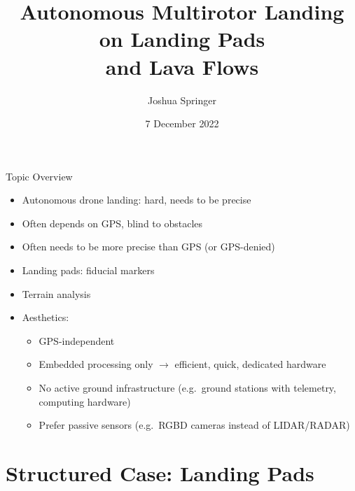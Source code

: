 \documentclass[aspectratio=169]{beamer}
\title{Autonomous Multirotor Landing on Landing Pads\\and Lava Flows}
\author{Joshua Springer}
\institute{Reykjavik University\\Department of Computer Science\\Supervisor: Marcel Kyas}
\date{7 December 2022}
\newcommand{\nologo}{\setbeamertemplate{logo}{}}
\begin{document}
\maketitle

\nologo

\begin{frame}{Topic Overview}
	\begin{itemize}
		\item Autonomous drone landing: hard, needs to be precise
		\item Often depends on GPS, blind to obstacles
		\item Often needs to be more precise than GPS (or GPS-denied)
		\item Landing pads: fiducial markers
		\item Terrain analysis
		\item Aesthetics:
		\begin{itemize}
			\item GPS-independent
			\item Embedded processing only $\rightarrow$ efficient, quick, dedicated hardware
			\item No active ground infrastructure (e.g.~ground stations with telemetry, computing hardware)
			\item Prefer passive sensors (e.g.~RGBD cameras instead of LIDAR/RADAR)
		\end{itemize}
	\end{itemize}
\end{frame}

\section{Structured Case: Landing Pads}
\end{document}
